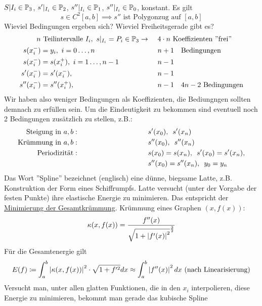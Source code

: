 \documentclass[../Skript.tex]{subfiles}
\begin{document}
\begin{question}\hfill\\
    $S\vert{I_i}\in \mathbb{P}_3$, $s'\vert_{I_i}\in\mathbb{P}_2$, $s''\vert_{I_i}\in\mathbb{P}_1$, $s''\vert_{I_i}\in\mathbb{P}_0$, konstant.
    Es gilt \[
        s \in C^2[a,b] \implies s'' \text{ ist Polygonzug auf }[a,b]
    \]
    Wieviel Bedingungen ergeben sich? Wieviel Freiheitsgerade gibt es?
    \begin{align*}
        n &\text{ Teilintervalle } I_i,\ s\vert_{I_i}=P_i\in\mathbb{P}_3 \to \ &&4\cdot n\ \text{Koeffizienten ''frei''}\\
    s(x_i^-)&=y_i,\ i=0\dots,n \ &&n+1\quad \text{Bedingungen}\\
        s(x_i^-)&=s(x_i^+),\ i=1\dots,n-1 \qquad &&n-1 \\
        s'(x_i^-)&=s'(x_i^-),  \ &&n-1 \\
        s''(x_i^-)&=s''(x_i^+),  \ &&n-1 \quad 4n-2 \text{ Bedingungen}
    \end{align*}
    Wir haben also weniger Bedingungen als Koeffizienten, die Bediungngen sollten demnach zu erfüllen sein. Um die 
    Eindeutigkeit zu bekommen sind eventuell noch 2 Bedingungen zusätzlich zu stellen, z.B.:
  \begin{align*}
      \text{Steigung in }a,b:\hspace{10em} & s'(x_0), \midspace s'(x_n)\\
      \text{Krümmung in }a,b:\hspace{10em}& s''(x_0), \midspace s''(x_n)\\
      \text{Periodizität}:\hspace{10em} & s(x_0) = s(x_n), \midspace s'(x_0) = s'(x_n),\\ & s''(x_0) = s''(x_n), \midspace 
      y_0 = y_n
  \end{align*}
  Das Wort ''Spline'' bezeichnet (englisch) eine dünne, biegsame Latte, z.B. Konstruktion der Form eines Schiffrumpfs. 
  Latte versucht (unter der Vorgabe der festen Punkte) ihre elastische Energie zu minimieren. Das entspricht der \underline{
  Minimierung der Gesamtkrümmung}. Krümmung eines Graphen $(x,f(x))$:\[
    \kappa(x,f(x)) = \frac{f''(x)}{\sqrt{1+\left\vert f'(x) \right\vert^2}^{\frac{3}{2}}}
  \]
  Für die Gesamtenergie gilt\[
    E(f) \coloneqq \int_a^b \left\vert \kappa(x,f(x)) \right\vert^2 \cdot \sqrt{1+f'^2} dx \approx \int_a^b \left\vert f''(x) \right\vert^2 dx \text{ (nach 
    Linearisierung)}
  \]
  Versucht man, unter allen glatten Funktionen, die in den $x_i$ interpolieren, diese Energie zu minimieren, bekommt man 
  gerade das kubische Spline
\end{question}
\end{document}
